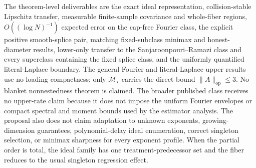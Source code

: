 \documentclass{article}
\begin{document}
The theorem-level deliverables are the exact ideal representation, collision-stable Lipschitz transfer, measurable finite-sample covariance and whole-fiber regions, \(O((\log N)^{-1})\) expected error on the cap-free Fourier class, the explicit positive smooth-splice pair, matching fixed-subclass minimax and honest-diameter results, lower-only transfer to the Sanjaroonpouri--Ramazi class and every superclass containing the fixed splice class, and the uniformly quantified literal-Laplace boundary. The general Fourier and literal-Laplace upper results use no loading compactness; only \(\mathcal M_\star\) carries the direct bound \(\|A\|_{\mathrm{op}}\le3\). No blanket nonnestedness theorem is claimed. The broader published class receives no upper-rate claim because it does not impose the uniform Fourier envelopes or compact spectral and moment bounds used by the estimator analysis. The proposal also does not claim adaptation to unknown exponents, growing-dimension guarantees, polynomial-delay ideal enumeration, correct singleton selection, or minimax sharpness for every exponent profile. When the partial order is total, the ideal family has one treatment-predecessor set and the fiber reduces to the usual singleton regression effect.
\end{document}

